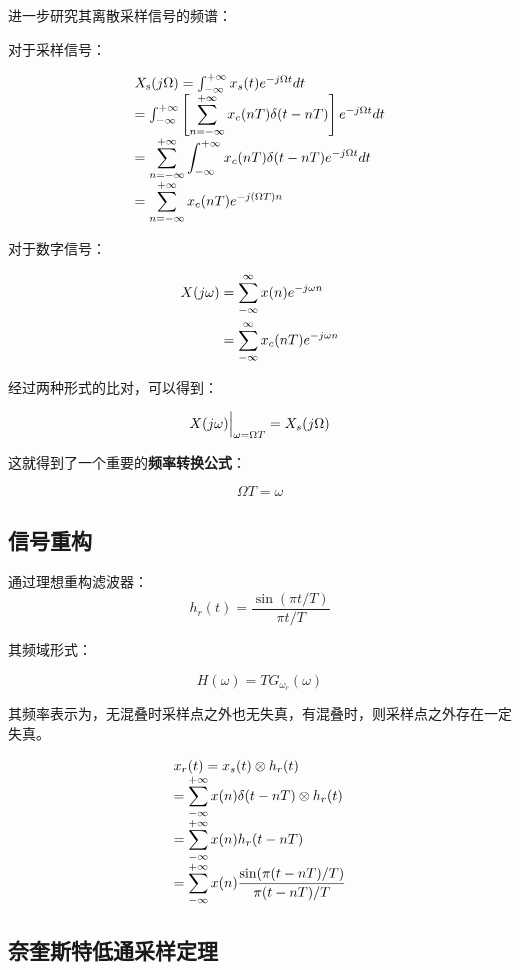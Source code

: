 \documentclass[cn,11pt,chinese,black,simple]{elegantbook}
\begin{document}
进一步研究其离散采样信号的频谱：

对于采样信号：

\[
\begin{array}{l}
X_{\mathrm{s}}(j \Omega)=\int_{-\infty}^{+\infty} x_{s}(t) e^{-j \Omega t} d t \\
=\int_{-\infty}^{+\infty}\left[\displaystyle\sum_{n=-\infty}^{+\infty} x_{c}(n T) \delta(t-n T)\right] e^{-j \Omega t} d t \\
=\displaystyle\sum_{n=-\infty}^{+\infty} \int_{-\infty}^{+\infty} x_{c}(n T) \delta(t-n T) e^{-j \Omega t} d t \\
=\displaystyle\sum_{n=-\infty}^{+\infty} x_{c}(n T) e^{-j(\Omega T) n}
\end{array}
\]

对于数字信号：

\[\begin{aligned}
    X(j\omega) &= \displaystyle\sum_{-\infty}^\infty x(n) e^{-j\omega n} \\
    &=  \displaystyle\sum_{-\infty}^\infty x_c(n T) e^{-j\omega n} 
\end{aligned}\]

经过两种形式的比对，可以得到：

\[X(j\omega)\Big|_{\omega=\Omega T} = X_s (j\Omega)\] 

这就得到了一个重要的\textbf{频率转换公式}：

\[\Omega T = \omega\]

\subsection{信号重构}

通过理想重构滤波器：\[
    h_{r}(t)=\dfrac{\sin (\pi t / T)}{\pi t / T}
    \]

其频域形式：

\[H(\omega) = T G_{\omega_c}(\omega)\]

其频率表示为，无混叠时采样点之外也无失真，有混叠时，则采样点之外存在一定失真。

\[
\begin{array}{l}
x_{r}(t)=x_{s}(t) \otimes h_{r}(t) \\
=\displaystyle\sum_{-\infty}^{+\infty} x(n) \delta(t-n T) \otimes h_{r}(t) \\
=\displaystyle\sum_{-\infty}^{+\infty} x(n) h_{r}(t-n T) \\
=\displaystyle\sum_{-\infty}^{+\infty} x(n) \dfrac{\sin (\pi(t-n T) / T)}{\pi(t-n T) / T}
\end{array}
\]

\subsection{奈奎斯特低通采样定理}
\end{document}

